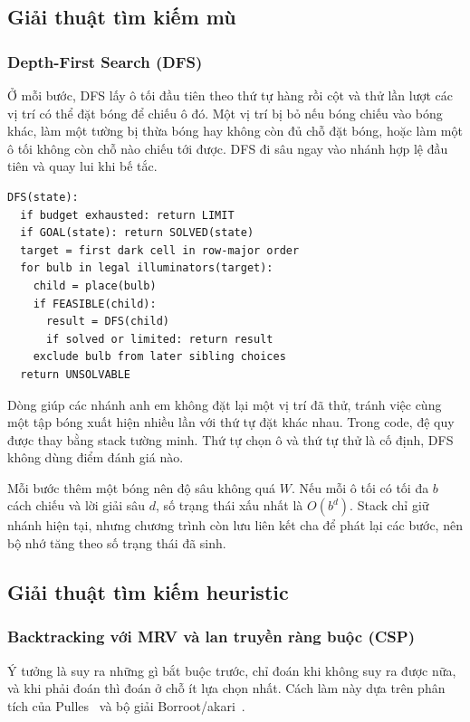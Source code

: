 \subsection{Giải thuật tìm kiếm mù}
\subsubsection*{Depth-First Search (DFS)}
Ở mỗi bước, DFS lấy ô tối đầu tiên theo thứ tự hàng rồi cột và thử lần lượt
các vị trí có thể đặt bóng để chiếu ô đó. Một vị trí bị bỏ nếu bóng chiếu vào
bóng khác, làm một tường bị thừa bóng hay không còn đủ chỗ đặt bóng, hoặc làm
một ô tối không còn chỗ nào chiếu tới được. DFS đi sâu ngay vào nhánh hợp lệ
đầu tiên và quay lui khi bế tắc.

\noindent\begin{minipage}{\textwidth}
\begin{lstlisting}
DFS(state):
  if budget exhausted: return LIMIT
  if GOAL(state): return SOLVED(state)
  target = first dark cell in row-major order
  for bulb in legal illuminators(target):
    child = place(bulb)
    if FEASIBLE(child):
      result = DFS(child)
      if solved or limited: return result
    exclude bulb from later sibling choices
  return UNSOLVABLE
\end{lstlisting}
\end{minipage}

Dòng  giúp các nhánh anh em không đặt lại một vị trí đã thử,
tránh việc cùng một tập bóng xuất hiện nhiều lần với thứ tự đặt khác nhau.
Trong code, đệ quy được thay bằng stack tường minh. Thứ tự chọn ô và thứ tự thử
là cố định, DFS không dùng điểm đánh giá nào.

Mỗi bước thêm một bóng nên độ sâu không quá $W$. Nếu mỗi ô tối có tối đa $b$
cách chiếu và lời giải sâu $d$, số trạng thái xấu nhất là $O(b^d)$. Stack chỉ
giữ nhánh hiện tại, nhưng chương trình còn lưu liên kết cha để phát lại các
bước, nên bộ nhớ tăng theo số trạng thái đã sinh.

\subsection{Giải thuật tìm kiếm heuristic}
\subsubsection*{Backtracking với MRV và lan truyền ràng buộc (CSP)}
Ý tưởng là suy ra những gì bắt buộc trước, chỉ đoán khi không suy ra được nữa,
và khi phải đoán thì đoán ở chỗ ít lựa chọn nhất. Cách làm này dựa trên phân
tích của Pulles~\cite{akari-analysis} và bộ giải Borroot/akari~\cite{akari-code}.

